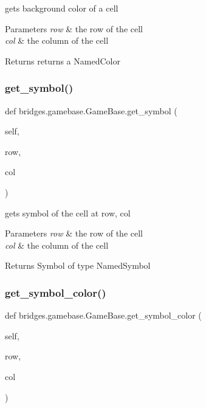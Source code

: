 gets background color of a cell 


\begin{DoxyParams}{Parameters}
{\em row} & the row of the cell \\
\hline
{\em col} & the column of the cell\\
\hline
\end{DoxyParams}
\begin{DoxyReturn}{Returns}
returns a Named\+Color 
\end{DoxyReturn}
\mbox{\label{classbridges_1_1gamebase_1_1_game_base_a80a3f5e32f8d0ad45c3f72d3c3e134e3}} 
\subsubsection{\texorpdfstring{get\+\_\+symbol()}{get\_symbol()}}
{\footnotesize\ttfamily def bridges.\+gamebase.\+Game\+Base.\+get\+\_\+symbol (\begin{DoxyParamCaption}\item[{}]{self,  }\item[{}]{row,  }\item[{}]{col }\end{DoxyParamCaption})}



gets symbol of the cell at row, col 


\begin{DoxyParams}{Parameters}
{\em row} & the row of the cell \\
\hline
{\em col} & the column of the cell\\
\hline
\end{DoxyParams}
\begin{DoxyReturn}{Returns}
Symbol of type Named\+Symbol 
\end{DoxyReturn}
\mbox{\label{classbridges_1_1gamebase_1_1_game_base_a7cb6637713536701e89e870a5a3428a1}} 
\subsubsection{\texorpdfstring{get\+\_\+symbol\+\_\+color()}{get\_symbol\_color()}}
{\footnotesize\ttfamily def bridges.\+gamebase.\+Game\+Base.\+get\+\_\+symbol\+\_\+color (\begin{DoxyParamCaption}\item[{}]{self,  }\item[{}]{row,  }\item[{}]{col }\end{DoxyParamCaption})}



